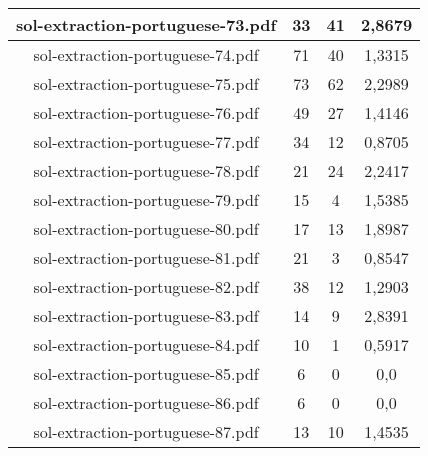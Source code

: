 \documentclass[11pt]{article}
\newlength\mylength
\begin{document}
\begin{center}
\begin{longtable}{||C{.40\mylength}||C{.30\mylength}||C{.30\mylength}||C{.30\mylength}||}
  sol-extraction-portuguese-73.pdf & 33 & 41 & 2,8679 \\  \hline
  sol-extraction-portuguese-74.pdf & 71 & 40 & 1,3315 \\  \hline
  sol-extraction-portuguese-75.pdf & 73 & 62 & 2,2989 \\  \hline
  sol-extraction-portuguese-76.pdf & 49 & 27 & 1,4146 \\  \hline
  sol-extraction-portuguese-77.pdf & 34 & 12 & 0,8705 \\  \hline
  sol-extraction-portuguese-78.pdf & 21 & 24 & 2,2417 \\  \hline
  sol-extraction-portuguese-79.pdf & 15 & 4 & 1,5385 \\  \hline
  sol-extraction-portuguese-80.pdf & 17 & 13 & 1,8987 \\  \hline
  sol-extraction-portuguese-81.pdf & 21 & 3 & 0,8547 \\  \hline
  sol-extraction-portuguese-82.pdf & 38 & 12 & 1,2903 \\  \hline
  sol-extraction-portuguese-83.pdf & 14 & 9 & 2,8391 \\  \hline
  sol-extraction-portuguese-84.pdf & 10 & 1 & 0,5917 \\  \hline
  sol-extraction-portuguese-85.pdf & 6 & 0 & 0,0 \\  \hline
  sol-extraction-portuguese-86.pdf & 6 & 0 & 0,0 \\  \hline
  sol-extraction-portuguese-87.pdf & 13 & 10 & 1,4535 \\  \hline

\end{longtable}
\end{center}
\end{document}
